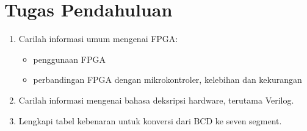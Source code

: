 \documentclass[a4paper,12pt,bahasa]{extarticle}
\begin{document}
\section{Tugas Pendahuluan}

\begin{enumerate}

\item Carilah informasi umum mengenai FPGA:
\begin{itemize}
\item penggunaan FPGA
\item perbandingan FPGA dengan mikrokontroler, kelebihan dan kekurangan
\end{itemize}

\item Carilah informasi mengenai bahasa deksripsi hardware, terutama Verilog.

\item Lengkapi tabel kebenaran untuk konversi dari BCD ke seven segment.
\end{enumerate}
\end{document}
